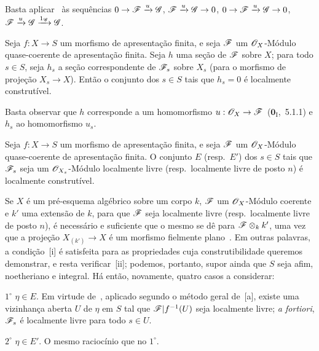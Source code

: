 Basta aplicar~ às sequências $0\to\sh{F}\xrightarrow{u}\sh{G}$, $\sh{F}\xrightarrow{u}\sh{G}\to 0$, $0\to\sh{F}\xrightarrow{u}\sh{G}\to 0$, $\mathscr{F}\xrightarrow{u}\mathscr{G}\xrightarrow{1_\mathscr{G}}\mathscr{G}$.

\begin{corollary}[9.4.6]
\label{IV.9.4.6}
Seja $f:X\to S$ um morfismo de apresentação finita, e seja $\mathscr{F}$ um $\mathscr{O}_X$-Módulo quase-coerente de apresentação finita.
Seja $h$ uma seção de $\mathscr{F}$ sobre $X$; para todo $s\in S$, seja $h_s$ a seção correspondente de $\mathscr{F}_s$ sobre $X_s$ \textnormal{(}para o morfismo de projeção $X_s\to X$\textnormal{)}.
Então o conjunto dos $s\in S$ tais que $h_s=0$ é localmente construtível.
\end{corollary}

Basta observar que $h$ corresponde a um homomorfismo $u:\sh{O}_X\to\sh{F}$~($\mathbf{0}_{\mathrm{I}}$,~5.1.1) e $h_s$ ao homomorfismo $u_s$.

\begin{proposition}[9.4.7]
\label{IV.9.4.7}
Seja $f:X\to S$ um morfismo de apresentação finita, e seja $\mathscr{F}$ um $\mathscr{O}_X$-Módulo quase-coerente de apresentação finita.
O conjunto $E$ \textnormal{(}resp.\ $E'$\textnormal{)} dos $s\in S$ tais que $\mathscr{F}_s$ seja um $\mathscr{O}_{X_s}$-Módulo localmente livre \textnormal{(}resp.\ localmente livre de posto $n$\textnormal{)} é localmente construtível.
\end{proposition}

Se $X$ é um pré-esquema algébrico sobre um corpo $k$, $\mathscr{F}$ um $\mathscr{O}_X$-Módulo coerente e $k'$ uma extensão de $k$, para que $\mathscr{F}$ seja localmente livre \textnormal{(}resp.\ localmente livre de posto $n$\textnormal{)}, é necessário e suficiente que o mesmo se dê para $\mathscr{F}\otimes_k k'$, uma vez que a projeção $X_{(k')}\to X$ é um morfismo fielmente plano~.
Em outras palavras, a condição~[i] é satisfeita para as propriedades cuja construtibilidade queremos demonstrar, e resta verificar~[ii]; podemos, portanto, supor ainda que $S$ seja afim, noetheriano e integral.
Há então, novamente, quatro casos a considerar:

$1^\circ$ $\eta\in E$.
Em virtude de~, aplicado segundo o método geral de~[a], existe uma vizinhança aberta $U$ de $\eta$ em $S$ tal que $\mathscr{F}|f^{-1}(U)$ seja localmente livre; \emph{a fortiori}, $\mathscr{F}_s$ é localmente livre para todo $s\in U$.

$2^\circ$ $\eta\in E'$.
O mesmo raciocínio que no $1^\circ$.

